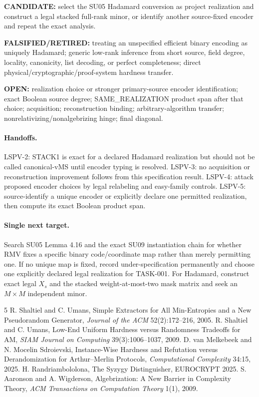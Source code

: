 \documentclass[11pt]{article}
\begin{document}
\textbf{CANDIDATE:} select the SU05 Hadamard conversion as project realization and construct a legal stacked full-rank minor, or identify another source-fixed encoder and repeat the exact analysis.

\textbf{FALSIFIED/RETIRED:} treating an unspecified efficient binary encoding as uniquely Hadamard; generic low-rank inference from short source, field degree, locality, canonicity, list decoding, or perfect completeness; direct physical/cryptographic/proof-system hardness transfer.

\textbf{OPEN:} realization choice or stronger primary-source encoder identification; exact Boolean source degree; SAME\_REALIZATION product span after that choice; acquisition; reconstruction binding; arbitrary-algorithm transfer; nonrelativizing/nonalgebrizing hinge; final diagonal.

\paragraph{Handoffs.}
LSPV-2: STACK1 is exact for a declared Hadamard realization but should not be called canonical-vMS until encoder typing is resolved. LSPV-3: no acquisition or reconstruction improvement follows from this specification result. LSPV-4: attack proposed encoder choices by legal relabeling and easy-family controls. LSPV-5: source-identify a unique encoder or explicitly declare one permitted realization, then compute its exact Boolean product span.

\paragraph{Single next target.}
Search SU05 Lemma 4.16 and the exact SU09 instantiation chain for whether RMV fixes a specific binary code/coordinate map rather than merely permitting one. If no unique map is fixed, record under-specification permanently and choose one explicitly declared legal realization for TASK-001. For Hadamard, construct exact legal $X_s$ and the stacked weight-at-most-two mask matrix and seek an $M\times M$ independent minor.

\begin{thebibliography}{5}
 R. Shaltiel and C. Umans, Simple Extractors for All Min-Entropies and a New Pseudorandom Generator, \emph{Journal of the ACM} 52(2):172--216, 2005.
 R. Shaltiel and C. Umans, Low-End Uniform Hardness versus Randomness Tradeoffs for AM, \emph{SIAM Journal on Computing} 39(3):1006--1037, 2009.
 D. van Melkebeek and N. Mocelin Sdroievski, Instance-Wise Hardness and Refutation versus Derandomization for Arthur--Merlin Protocols, \emph{Computational Complexity} 34:15, 2025.
 H. Randriambololona, The Syzygy Distinguisher, EUROCRYPT 2025.
 S. Aaronson and A. Wigderson, Algebrization: A New Barrier in Complexity Theory, \emph{ACM Transactions on Computation Theory} 1(1), 2009.
\end{thebibliography}
\end{document}
